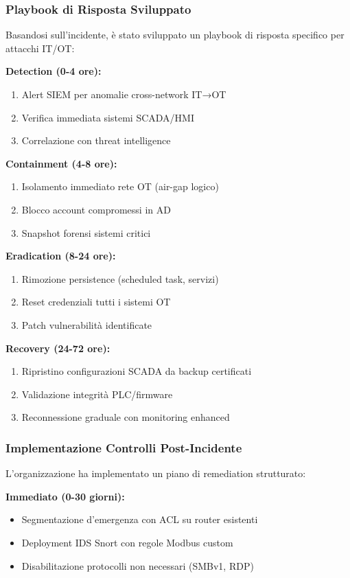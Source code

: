 \subsubsection{Playbook di Risposta Sviluppato}

Basandosi sull'incidente, è stato sviluppato un playbook di risposta specifico per attacchi IT/OT:

\textbf{Detection (0-4 ore):}
\begin{enumerate}
    \item Alert SIEM per anomalie cross-network IT→OT
    \item Verifica immediata sistemi SCADA/HMI
    \item Correlazione con threat intelligence
\end{enumerate}

\textbf{Containment (4-8 ore):}
\begin{enumerate}
    \item Isolamento immediato rete OT (air-gap logico)
    \item Blocco account compromessi in AD
    \item Snapshot forensi sistemi critici
\end{enumerate}

\textbf{Eradication (8-24 ore):}
\begin{enumerate}
    \item Rimozione persistence (scheduled task, servizi)
    \item Reset credenziali tutti i sistemi OT
    \item Patch vulnerabilità identificate
\end{enumerate}

\textbf{Recovery (24-72 ore):}
\begin{enumerate}
    \item Ripristino configurazioni SCADA da backup certificati
    \item Validazione integrità PLC/firmware
    \item Reconnessione graduale con monitoring enhanced
\end{enumerate}

\subsubsection{Implementazione Controlli Post-Incidente}

L'organizzazione ha implementato un piano di remediation strutturato:

\textbf{Immediato (0-30 giorni):}
\begin{itemize}
    \item Segmentazione d'emergenza con ACL su router esistenti
    \item Deployment IDS Snort con regole Modbus custom
    \item Disabilitazione protocolli non necessari (SMBv1, RDP)
\end{itemize}

